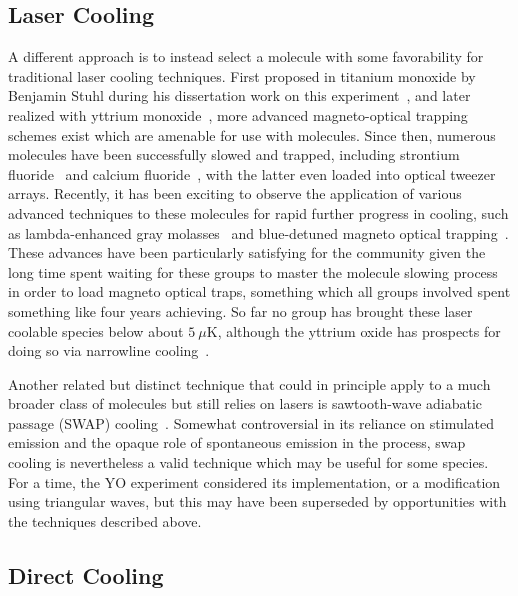 \subsection{Laser Cooling}

A different approach is to instead select a molecule with some favorability for traditional laser cooling techniques.
First proposed in titanium monoxide by Benjamin Stuhl during his dissertation work on this experiment~\cite{Stuhl2008}, and later realized with yttrium monoxide~\cite{Collopy2018}, more advanced magneto-optical trapping schemes exist which are amenable for use with molecules.
Since then, numerous molecules have been successfully slowed and trapped, including strontium fluoride~\cite{Steinecker2016} and calcium fluoride~\cite{Anderegg2019}, with the latter even loaded into optical tweezer arrays.
Recently, it has been exciting to observe the application of various advanced techniques to these molecules for rapid further progress in cooling, such as lambda-enhanced gray molasses~\cite{Anderegg2018} and blue-detuned magneto optical trapping~\cite{Jarvis2018}.
These advances have been particularly satisfying for the community given the long time spent waiting for these groups to master the molecule slowing process in order to load magneto optical traps, something which all groups involved spent something like four years achieving.
So far no group has brought these laser coolable species below about $5~\mu$K, although the yttrium oxide has prospects for doing so via narrowline cooling~\cite{Collopy2015}.

Another related but distinct technique that could in principle apply to a much broader class of molecules but still relies on lasers is sawtooth-wave adiabatic passage (SWAP) cooling~\cite{Bartolotta2018}.
Somewhat controversial in its reliance on stimulated emission and the opaque role of spontaneous emission in the process, swap cooling is nevertheless a valid technique which may be useful for some species.
For a time, the YO experiment considered its implementation, or a modification using triangular waves, but this may have been superseded by opportunities with the techniques described above.

\subsection{Direct Cooling}

